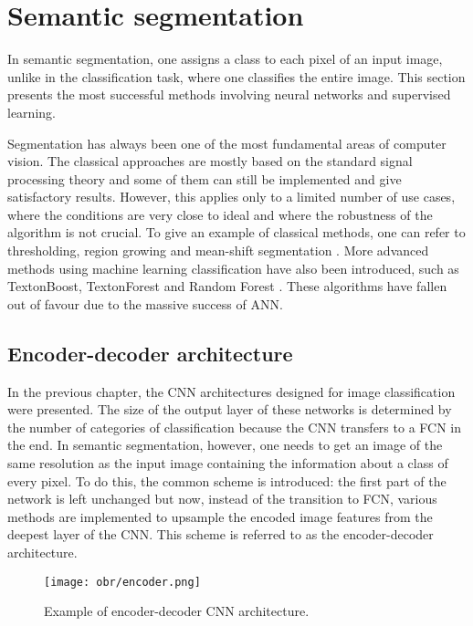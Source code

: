 \newpage
\section{Semantic segmentation}

In semantic segmentation, one assigns a class to each pixel of an input image, unlike in the classification task, where one classifies the entire image. This section presents the most successful methods involving neural networks and supervised learning. 

Segmentation has always been one of the most fundamental areas of computer vision. The classical approaches are mostly based on the standard signal processing theory and some of them can still be implemented and give satisfactory results. However, this applies only to a limited number of use cases, where the conditions are very close to ideal and where the robustness of the algorithm is not crucial. To give an example of classical methods, one can refer to thresholding, region growing and mean-shift segmentation \cite{coufal}. More advanced methods using machine learning classification have also been introduced, such as TextonBoost, TextonForest and Random Forest \cite{segnet} \cite{bayesian}. These algorithms have fallen out of favour due to the massive success of ANN.

\subsection{Encoder-decoder architecture}

In the previous chapter, the CNN architectures designed for image classification were presented. The size of the output layer of these networks is determined by the number of categories of classification because the CNN transfers to a FCN in the end. In semantic segmentation, however, one needs to get an image of the same resolution as the input image containing the information about a class of every pixel. To do this, the common scheme is introduced: the first part of the network is left unchanged but now, instead of the transition to FCN, various methods are implemented to upsample the encoded image features from the deepest layer of the CNN. This scheme is referred to as the encoder-decoder architecture. 

\vspace{4mm}
\begin{figure}[h]
	\begin{center}
		\texttt{[image: obr/encoder.png]}
	\end{center}
	\vspace{4mm}
	\caption{Example of encoder-decoder CNN architecture. \cite{zeltner}} 
	\label{encoder}
\end{figure}

